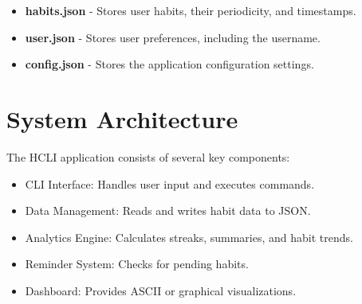 \documentclass[a4paper,12pt]{article}
\begin{document}
\begin{itemize}
    \item \textbf{habits.json} - Stores user habits, their periodicity, and timestamps.
    \item \textbf{user.json} - Stores user preferences, including the username.
    \item \textbf{config.json} - Stores the application configuration settings.
\end{itemize}

\section{System Architecture}
The HCLI application consists of several key components:

\begin{itemize}
    \item CLI Interface: Handles user input and executes commands.
    \item Data Management: Reads and writes habit data to JSON.
    \item Analytics Engine: Calculates streaks, summaries, and habit trends.
    \item Reminder System: Checks for pending habits.
    \item Dashboard: Provides ASCII or graphical visualizations.
\end{itemize}
\end{document}

